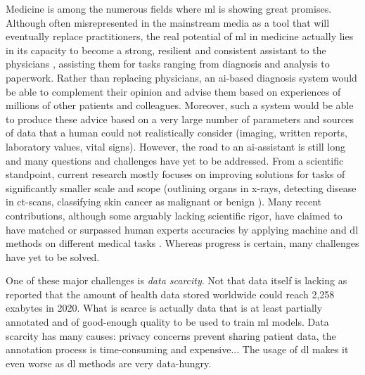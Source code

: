 Medicine is among the numerous fields where \acrlong{ml} is showing great promises. Although often misrepresented in the mainstream media as a tool that will eventually replace practitioners, the real potential of \acrlong{ml} in medicine actually lies in its capacity to become a strong, resilient and consistent assistant to the physicians \parencite{rajkomar2019machine}, assisting them for tasks ranging from diagnosis and analysis to paperwork. Rather than replacing physicians, an \acrshort{ai}-based diagnosis system would be able to complement their opinion and advise them based on experiences of millions of other patients and colleagues. Moreover, such a system would be able to produce these advice based on a very large number of parameters and sources of data that a human could not realistically consider (imaging, written reports, laboratory values, vital signs). However, the road to an \acrshort{ai}-assistant is still long and many questions and challenges have yet to be addressed. From a scientific standpoint, current research mostly focuses on improving solutions for tasks of significantly smaller scale and scope (\eg outlining organs in x-rays, detecting disease in \acrshort{ct}-scans, classifying skin cancer as malignant or benign ). Many recent contributions, although some arguably lacking scientific rigor, have claimed to have matched or surpassed human experts accuracies by applying machine and \acrlong{dl} methods on different medical tasks \parencite{nagendran2020artificial}. Whereas progress is certain, many challenges have yet to be solved. 

One of these major challenges is \textit{data scarcity}. Not that data itself is lacking as \parencite{pramanik2019healthcare} reported that the amount of health data stored worldwide could reach 2,258 exabytes in 2020. What is scarce is actually data that is at least partially annotated and of good-enough quality to be used to train \acrlong{ml} models. Data scarcity has many causes: privacy concerns prevent sharing patient data, the annotation process is time-consuming and expensive... The usage of \acrlong{dl} makes it even worse as \acrshort{dl} methods are very data-hungry.

